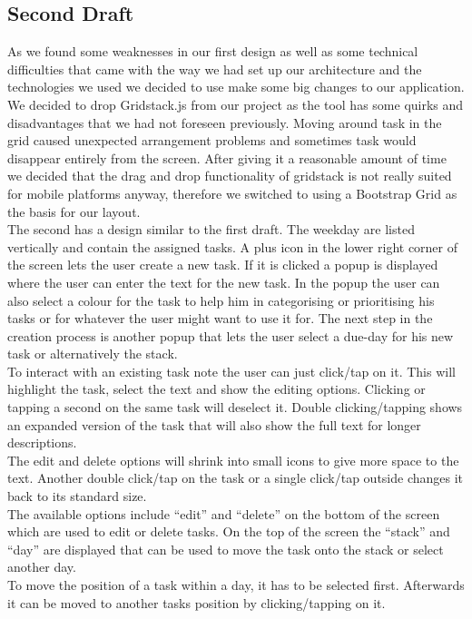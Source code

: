 \subsection{Second Draft}

As we found some weaknesses in our first design as well as some technical difficulties that came with the way we had set up our architecture and the technologies we used we decided to use make some big changes to our application. 
We decided to drop Gridstack.js from our project as the tool has some quirks and disadvantages that we had not foreseen previously.  
Moving around task in the grid caused unexpected arrangement problems and sometimes task would disappear entirely from the screen. 
After giving it a reasonable amount of time we decided that the drag and drop functionality of gridstack is not really suited for mobile platforms anyway, 
therefore we switched to using a Bootstrap Grid as the basis for our layout. \\
The second has a design similar to the first draft. 
The weekday are listed vertically and contain the assigned tasks. 
A plus icon in the lower right corner of the screen lets the user create a new task. 
If it is clicked a popup is displayed where the user can enter the text for the new task. 
In the popup the user can also select a colour for the task to help him in categorising or prioritising his tasks or for whatever the user might want to use it for. 
The next step in the creation process is another popup that lets the user select a due-day for his new task or alternatively the stack. \\
To interact with an existing task note the user can just click/tap on it. 
This will highlight the task, select the text and show the editing options. 
Clicking or tapping a second on the same task will deselect it. 
Double clicking/tapping shows an expanded version of the task that will also show the full text for longer descriptions. \\
The edit and delete options will shrink into small icons to give more space to the text. 
Another double click/tap on the task or a single click/tap outside changes it back to its standard size. \\
The available options include “edit” and “delete” on the bottom of the screen which are used to edit or delete tasks. 
On the top of the screen the “stack” and “day” are displayed that can be used to move the task onto the stack or select another day. \\
To move the position of a task within a day, it has to be selected first. Afterwards it can be moved to another tasks position by clicking/tapping on it. 
